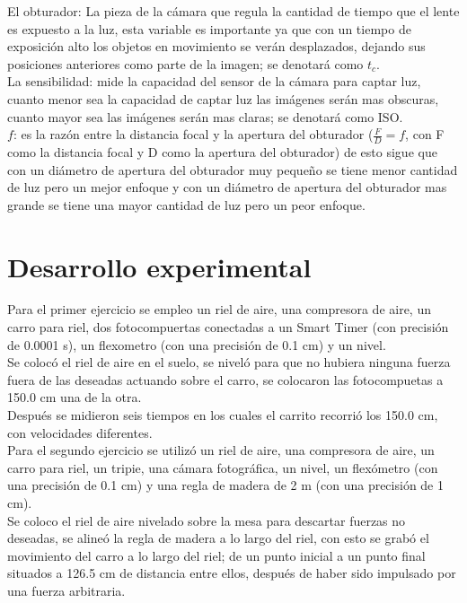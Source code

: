 \documentclass[12pt,a4paper]{article}
\begin{document}
El obturador: La pieza de la cámara que regula la cantidad de tiempo que el lente es expuesto a la luz, esta variable es importante ya que con un tiempo de exposición alto los objetos en movimiento se verán desplazados, dejando sus posiciones anteriores como parte de la imagen; se denotará como $t_c$.\\

La sensibilidad: mide la capacidad del sensor de la cámara para captar luz, cuanto menor sea la capacidad de captar luz las imágenes serán mas obscuras, cuanto mayor sea las imágenes serán mas claras; se denotará como ISO.\\

$f$: es la razón entre la distancia focal y la apertura del obturador ($\frac{F}{D} = f$, con F como la distancia focal y D como la apertura del obturador) de esto sigue que con un diámetro de apertura del obturador muy pequeño se tiene menor cantidad de luz pero un mejor enfoque y con un diámetro de apertura del obturador mas grande se tiene una mayor cantidad de luz pero un peor enfoque.

\section{Desarrollo experimental}

Para el primer ejercicio se empleo un riel de aire, una compresora de aire, un carro para riel, dos fotocompuertas conectadas a un Smart Timer (con precisión de 0.0001 s), un flexometro (con una precisión de 0.1 cm)  y un nivel.\\
Se colocó el riel de aire en el suelo, se niveló para que no hubiera ninguna fuerza fuera de las deseadas actuando sobre el carro, se colocaron las fotocompuetas a 150.0 cm una de la otra.\\
Después se midieron seis tiempos en los cuales el carrito recorrió los 150.0 cm, con velocidades diferentes.\\

Para el segundo ejercicio se utilizó un riel de aire, una compresora de aire, un carro para riel, un tripie, una cámara fotográfica, un nivel, un flexómetro (con una precisión de 0.1 cm) y una regla de madera de 2 m (con una precisión de 1 cm).\\
Se coloco el riel de aire nivelado sobre la mesa para descartar fuerzas no deseadas, se alineó la regla de madera a lo largo del riel, con esto se grabó el movimiento del carro a lo largo del riel; de un punto inicial a un punto final situados a 126.5 cm de distancia entre ellos, después de haber sido impulsado por una fuerza arbitraria.\\
\end{document}
